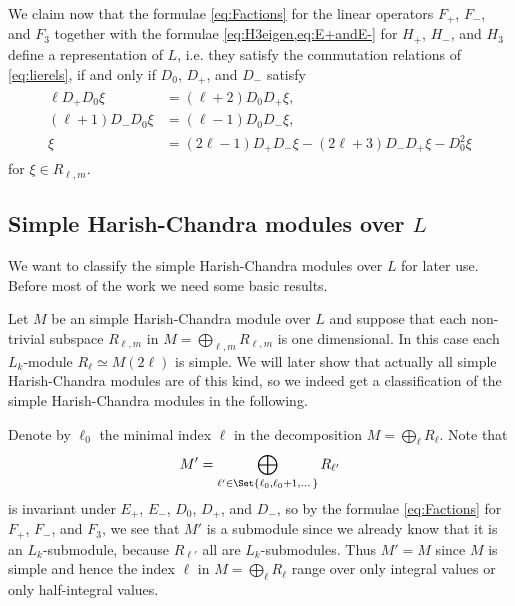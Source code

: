 We claim now that the formulae \cref{eq:Factions} for the linear operators $F_+$, $F_-$, and $F_3$ together with the formulae \cref{eq:H3eigen,eq:E+andE-} for $H_+$, $H_-$, and $H_3$ define a representation of $L$, i.e. they satisfy the commutation relations of \cref{eq:lierels}, if and only if $D_0$, $D_+$, and $D_-$ satisfy
\begin{align}\label{eq:Drels}
  \begin{aligned}
    \ell D_+D_0 \xi &= (\ell+2)D_0 D_+ \xi, \\
    (\ell+1)D_-D_0 \xi &= (\ell-1)D_0D_-\xi, \\
    \xi &= (2\ell-1)D_+D_- \xi - (2\ell+3)D_-D_+\xi - D_0^2\xi
  \end{aligned}
\end{align}
for $\xi\in R_{\ell,m}$. 

\subsection{\texorpdfstring{Simple Harish-Chandra modules over $L$}{Simple Harish-Chandra modules over L}}

We want to classify the simple Harish-Chandra modules over $L$ for later use. Before most of the work we need some basic results.

Let $M$ be an simple Harish-Chandra module over $L$ and suppose that each non-trivial subspace $R_{\ell,m}$ in $M=\bigoplus_{\ell,m} R_{\ell,m}$ is one dimensional. In this case each $L_k$-module $R_\ell\simeq M(2\ell)$ is simple. We will later show that actually all simple Harish-Chandra modules are of this kind, so we indeed get a classification of the simple Harish-Chandra modules in the following.

Denote by $\ell_0$ the minimal index $\ell$ in the decomposition $M=\bigoplus_\ell R_\ell$. Note that
\begin{align*}
  M' = \bigoplus_{\ell'\in\Set{\ell_0,\ell_0+1,\dotsc}} R_{\ell'}
\end{align*}
is invariant under $E_+$, $E_-$, $D_0$, $D_+$, and $D_-$, so by the formulae \cref{eq:Factions} for $F_+$, $F_-$, and $F_3$, we see that $M'$ is a submodule since we already know that it is an $L_k$-submodule, because $R_{\ell'}$ all are $L_k$-submodules. Thus $M'=M$ since $M$ is simple and hence the index $\ell$ in $M=\bigoplus_\ell R_\ell$ range over only integral values or only half-integral values.

